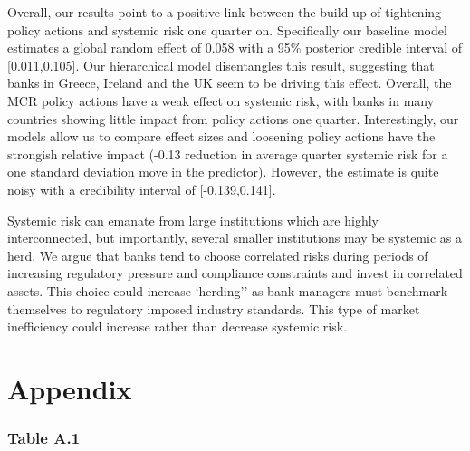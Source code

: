 \documentclass[
  10pt,
]{article}
\begin{document}
Overall, our results point to a positive link between the build-up of
tightening policy actions and systemic risk one quarter on. Specifically
our baseline model estimates a global random effect of 0.058 with a 95\%
posterior credible interval of {[}0.011,0.105{]}. Our hierarchical model
disentangles this result, suggesting that banks in Greece, Ireland and
the UK seem to be driving this effect. Overall, the MCR policy actions
have a weak effect on systemic risk, with banks in many countries
showing little impact from policy actions one quarter. Interestingly,
our models allow us to compare effect sizes and loosening policy actions
have the strongish relative impact (-0.13 reduction in average quarter
systemic risk for a one standard deviation move in the predictor).
However, the estimate is quite noisy with a credibility interval of
{[}-0.139,0.141{]}.

Systemic risk can emanate from large institutions which are highly
interconnected, but importantly, several smaller institutions may be
systemic as a herd. We argue that banks tend to choose correlated risks
during periods of increasing regulatory pressure and compliance
constraints and invest in correlated assets. This choice could increase
`herding'' as bank managers must benchmark themselves to regulatory
imposed industry standards. This type of market inefficiency could
increase rather than decrease systemic risk.

\hypertarget{appendix}{%
\section{Appendix}\label{appendix}}

\hypertarget{table-a.1}{%
\subsubsection{Table A.1}\label{table-a.1}}
\end{document}
